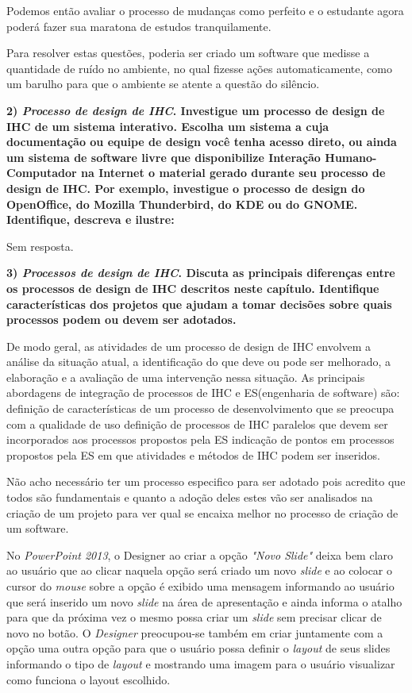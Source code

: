 \documentclass[
	article,			%
	11pt,				%
	oneside,			%
	a4paper,			%
	english,			%
	brazil,				%
	sumario=tradicional
	]{abntex2}
\begin{document}
Podemos então avaliar o processo de mudanças como perfeito e o estudante agora poderá fazer sua maratona de estudos tranquilamente.

Para resolver estas questões, poderia ser criado um software que medisse a quantidade de ruído no ambiente, no qual fizesse ações automaticamente, como um barulho para que o ambiente se atente a questão do silêncio.

\textbf{2) \textbf{\textit{Processo de design de IHC}. Investigue um processo de design de IHC de um sistema interativo. Escolha um sistema a cuja documentação ou equipe de design você tenha acesso direto, ou ainda um sistema de software livre que disponibilize Interação Humano-Computador na Internet o material gerado durante seu processo de design de IHC. Por exemplo, investigue o processo de design do OpenOffice, do Mozilla Thunderbird, do KDE ou do GNOME. Identifique, descreva e ilustre:}}

Sem resposta.


\textbf{3) \textit{Processos de design de IHC}. Discuta as principais diferenças entre os processos de design de IHC descritos neste capítulo. Identifique características dos projetos que ajudam a tomar decisões sobre quais processos podem ou devem ser adotados.}

De modo geral, as atividades de um processo de design de IHC envolvem a análise da situação atual, a identificação do que deve ou pode ser melhorado, a elaboração e a avaliação de uma intervenção nessa situação. As principais abordagens de integração de processos de IHC e ES(engenharia de software) são:
definição de características de um processo de desenvolvimento que se preocupa com a qualidade de uso definição de processos de IHC paralelos que devem ser incorporados aos processos propostos pela ES indicação de pontos em processos propostos pela ES em que atividades e métodos de IHC podem ser inseridos.

Não acho necessário ter um processo especifico para ser adotado pois acredito que todos são fundamentais e quanto a adoção deles estes vão ser analisados na criação de um projeto para ver qual se encaixa melhor no processo de criação de um software.

No \textit{PowerPoint 2013}, o Designer ao criar a opção \textit{"Novo Slide"} deixa bem claro ao usuário que ao clicar naquela opção será criado um novo \textit{slide} e ao colocar o cursor do \textit{mouse} sobre a opção é exibido uma mensagem informando ao usuário que será inserido um novo \textit{slide} na área de apresentação e ainda informa o atalho para que da próxima vez o mesmo possa criar um \textit{slide} sem precisar clicar de novo no botão. O \textit{Designer} preocupou-se também em criar juntamente com a opção uma outra opção para que o usuário possa definir o \textit{layout} de seus slides informando o tipo de \textit{layout} e mostrando uma imagem para o usuário visualizar como funciona o layout escolhido.
\end{document}
